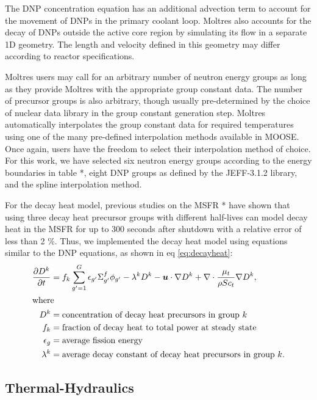 The \gls{DNP} concentration equation has an additional advection term to
account for the movement of \glspl{DNP} in the primary coolant loop. Moltres
also accounts for the decay of \glspl{DNP} outside the active core
region by simulating its flow in a separate 1D geometry. The length and
velocity defined in this geometry may differ according to reactor
specifications.

Moltres users may call for an arbitrary number of neutron energy groups as
long as they provide Moltres with the appropriate group constant data. The
number of precursor groups is also arbitrary, though usually pre-determined by
the choice of nuclear data library in the group constant generation step.
Moltres automatically interpolates the group constant data for required
temperatures using one of the many pre-defined interpolation methods available
in \gls{MOOSE}. Once again, users have the freedom to select their
interpolation method of choice. For this work, we have selected six neutron
energy groups according to the energy boundaries in table *, eight \gls{DNP}
groups as defined by the JEFF-3.1.2 library, and the spline interpolation
method.

For the decay heat model, previous studies on the MSFR * have shown that
using three decay heat precursor groups with different half-lives can model
decay heat in the MSFR for up to 300 seconds after shutdown with a relative
error of less than 2 \%. Thus, we implemented the decay heat model using
equations similar to the \gls{DNP} equations, as shown in eq
\ref{eq:decayheat}:
%
\begin{align}
	\frac{\partial D^k}{\partial t} &= f_k \sum^G_{g'=1} \epsilon_{g'}
	\Sigma^f_{g'} \phi_{g'} - \lambda^k D^k - \boldsymbol{u} \cdot \nabla D^k
	+ \nabla \cdot \frac{\mu_t}{\rho Sc_t} \nabla D^k, \label{eq:decayheat} \\
	\intertext{where}
	D^k &= \text{concentration of decay heat precursors in group }k \nonumber
	\\
	f_k &= \text{fraction of decay heat to total power at steady state}
	\nonumber \\
	\epsilon_g &= \text{average fission energy} \nonumber \\
	\lambda^k &= \text{average decay constant of decay heat precursors in
	group }k. \nonumber
\end{align}


\subsection{Thermal-Hydraulics}

